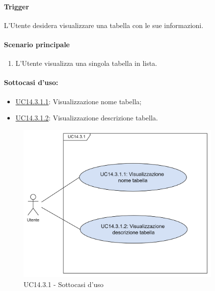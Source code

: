 \paragraph*{Trigger}
L'Utente desidera visualizzare una tabella con le sue informazioni.

\paragraph*{Scenario principale}
\begin{enumerate}
  \item L'Utente visualizza una singola tabella in lista.
\end{enumerate}

\paragraph*{Sottocasi d'uso:}
\begin{itemize}
  \item \hyperref[UC14point3point1point1]{UC14.3.1.1}: Visualizzazione nome tabella;
  \item \hyperref[UC14point3point1point2]{UC14.3.1.2}: Visualizzazione descrizione tabella.
\end{itemize}

\begin{figure}[H]
  \centering
  \includegraphics[width=0.90\textwidth]{assets/uc14_3_1_1.png}
  \caption{UC14.3.1 - Sottocasi d'uso}
\end{figure}


